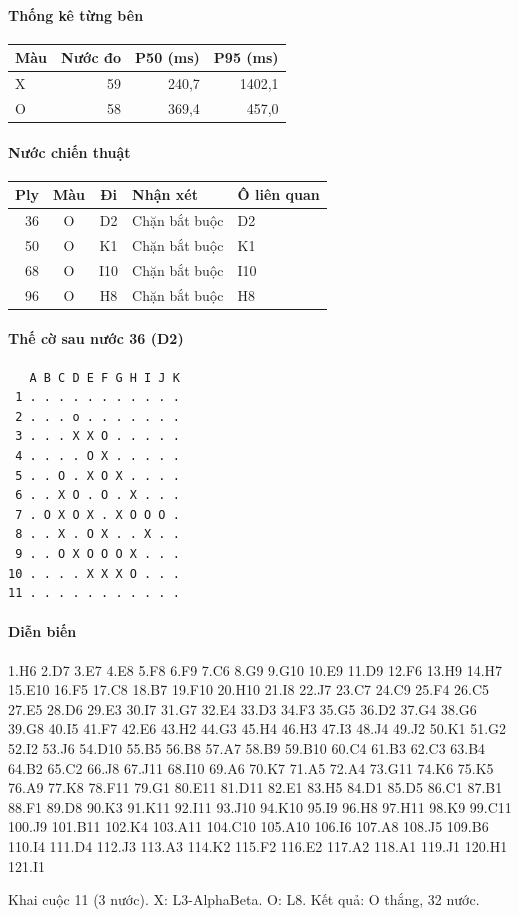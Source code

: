 \paragraph{Thống kê từng bên}
\begin{center}\small
\begin{tabular}{@{}lrrr@{}}
\toprule
Màu & Nước đo & P50 (ms) & P95 (ms) \\
\midrule
X & 59 & 240,7 & 1402,1 \\
O & 58 & 369,4 & 457,0 \\
\bottomrule
\end{tabular}
\end{center}
\paragraph{Nước chiến thuật}
\begin{center}\small
\begin{tabular}{@{}rccll@{}}
\toprule
Ply & Màu & Đi & Nhận xét & Ô liên quan \\
\midrule
36 & O & D2 & Chặn bắt buộc & D2 \\
50 & O & K1 & Chặn bắt buộc & K1 \\
68 & O & I10 & Chặn bắt buộc & I10 \\
96 & O & H8 & Chặn bắt buộc & H8 \\
\bottomrule
\end{tabular}
\end{center}
\paragraph{Thế cờ sau nước 36 (D2)}
\begin{verbatim}
   A B C D E F G H I J K
 1 . . . . . . . . . . .
 2 . . . o . . . . . . .
 3 . . . X X O . . . . .
 4 . . . . O X . . . . .
 5 . . O . X O X . . . .
 6 . . X O . O . X . . .
 7 . O X O X . X O O O .
 8 . . X . O X . . X . .
 9 . . O X O O O X . . .
10 . . . . X X X O . . .
11 . . . . . . . . . . .
\end{verbatim}
\paragraph{Diễn biến}
{\footnotesize 1.H6 2.D7 3.E7 4.E8 5.F8 6.F9 7.C6 8.G9 9.G10 10.E9 11.D9 12.F6 13.H9 14.H7 15.E10 16.F5 17.C8 18.B7 19.F10 20.H10 21.I8 22.J7 23.C7 24.C9 25.F4 26.C5 27.E5 28.D6 29.E3 30.I7 31.G7 32.E4 33.D3 34.F3 35.G5 36.D2 37.G4 38.G6 39.G8 40.I5 41.F7 42.E6 43.H2 44.G3 45.H4 46.H3 47.I3 48.J4 49.J2 50.K1 51.G2 52.I2 53.J6 54.D10 55.B5 56.B8 57.A7 58.B9 59.B10 60.C4 61.B3 62.C3 63.B4 64.B2 65.C2 66.J8 67.J11 68.I10 69.A6 70.K7 71.A5 72.A4 73.G11 74.K6 75.K5 76.A9 77.K8 78.F11 79.G1 80.E11 81.D11 82.E1 83.H5 84.D1 85.D5 86.C1 87.B1 88.F1 89.D8 90.K3 91.K11 92.I11 93.J10 94.K10 95.I9 96.H8 97.H11 98.K9 99.C11 100.J9 101.B11 102.K4 103.A11 104.C10 105.A10 106.I6 107.A8 108.J5 109.B6 110.I4 111.D4 112.J3 113.A3 114.K2 115.F2 116.E2 117.A2 118.A1 119.J1 120.H1 121.I1\par}
Khai cuộc 11 (3 nước). X: L3-AlphaBeta. O: L8. Kết quả: O thắng, 32 nước.
